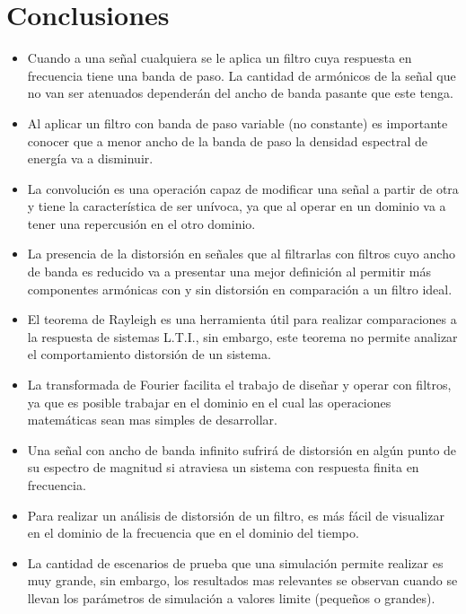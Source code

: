 \section{Conclusiones}\label{sec:conclusiones}
\begin{itemize}
    \item Cuando a una señal cualquiera se le aplica un filtro cuya respuesta en frecuencia tiene una banda de paso. La cantidad de armónicos de la señal que no van ser atenuados dependerán del ancho de banda pasante que este tenga.
    \item Al aplicar un filtro con banda de paso variable (no constante) es importante conocer que a menor ancho de la banda de paso la densidad espectral de energía va a disminuir.
    \item La convolución es una operación capaz de modificar una señal a partir de otra y tiene la característica de ser unívoca, ya que al operar en un dominio va a tener una repercusión en el otro dominio.
    \item La presencia de la distorsión en señales que al filtrarlas con filtros cuyo ancho de banda es reducido va a presentar una mejor definición al permitir más componentes armónicas con y sin distorsión en comparación a un filtro ideal.
    \item El teorema de Rayleigh es una herramienta útil para realizar comparaciones a la respuesta de sistemas L.T.I., sin embargo, este teorema no permite analizar el comportamiento distorsión de un sistema.
    \item La transformada de Fourier facilita el trabajo de diseñar y operar con filtros, ya que es posible trabajar en el dominio en el cual las operaciones matemáticas sean mas simples de desarrollar.
    \item Una señal con ancho de banda infinito sufrirá de distorsión en algún punto de su espectro de magnitud si atraviesa un sistema con respuesta finita en frecuencia.
    \item Para realizar un análisis de distorsión de un filtro, es más fácil de visualizar en el dominio de la frecuencia que en el dominio del tiempo.
    \item La cantidad de escenarios de prueba que una simulación permite realizar es muy grande, sin embargo, los resultados mas relevantes se observan cuando se llevan los parámetros de simulación a valores limite (pequeños o grandes).
\end{itemize}
